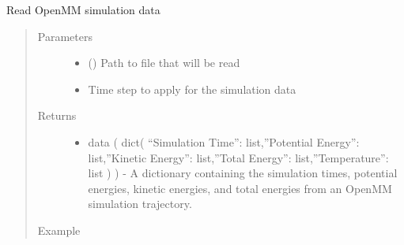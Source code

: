 \documentclass[letterpaper,12pt,english,openany,oneside]{sphinxmanual}
\begin{document}

\begin{fulllineitems}
\label{\detokenize{simulation:simulation.tools.read_simulation_data}}
Read OpenMM simulation data
\begin{quote}\begin{description}
\item[{Parameters}] \leavevmode\begin{itemize}
\item {} 
 () \textendash{} Path to file that will be read

\item {} 
 \textendash{} Time step to apply for the simulation data

\end{itemize}

\item[{Returns}] \leavevmode
\begin{itemize}
\item {} 
data ( dict( “Simulation Time”: list,”Potential Energy”: list,”Kinetic Energy”: list,”Total Energy”: list,”Temperature”: list ) ) - A dictionary containing the simulation times, potential energies, kinetic energies, and total energies from an OpenMM simulation trajectory.

\end{itemize}


\item[{Example}] \leavevmode
\end{description}\end{quote}

\begin{sphinxVerbatim}[commandchars=\\\{\}]
   
  
    
  
\end{sphinxVerbatim}

\end{fulllineitems}
\end{document}
